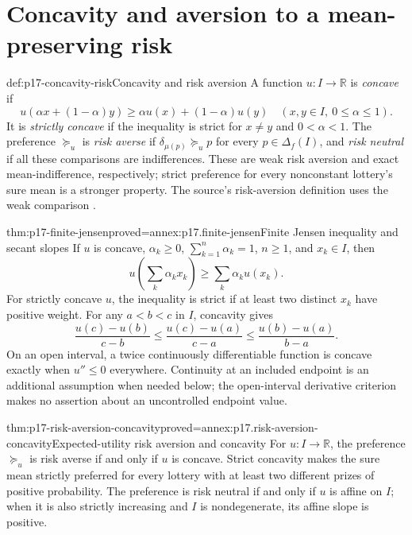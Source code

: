 \section{Concavity and aversion to a mean-preserving risk}
\label{sec:p17-risk-concavity}

\begin{hbdefinition}{def:p17-concavity-risk}{Concavity and risk aversion}
A function \(u:I\to\mathbb R\) is \emph{concave} if
\[
 u(\alpha x+(1-\alpha)y)
       \geq\alpha u(x)+(1-\alpha)u(y)
          \quad(x,y\in I,\ 0\leq\alpha\leq1).
\]
It is \emph{strictly concave} if the inequality is strict for
\(x\ne y\) and \(0<\alpha<1\).
The preference \(\succeq_u\) is \emph{risk averse} if
\(\delta_{\mu(p)}\succeq_u p\) for every \(p\in\Delta_f(I)\),
and \emph{risk neutral} if all these comparisons are indifferences.
These are weak risk aversion and exact mean-indifference, respectively;
strict preference for every nonconstant lottery's sure mean is a
stronger property. The source's risk-aversion definition uses the weak
comparison \cite[pp.~110--111]{Rubinstein2015LectureNotes}.
\end{hbdefinition}

\begin{hblemma}{thm:p17-finite-jensen}{proved=annex:p17.finite-jensen}{Finite Jensen inequality and secant slopes}
If \(u\) is concave, \(\alpha_k\geq0\), \(\sum_{k=1}^n\alpha_k=1\),
\(n\geq1\), and \(x_k\in I\), then
\[
             u\left(\sum_k\alpha_kx_k\right)
                        \geq\sum_k\alpha_ku(x_k).
\]
For strictly concave \(u\), the inequality is strict if at least two
distinct \(x_k\) have positive weight. For any \(a<b<c\) in \(I\),
concavity gives
\[
 \frac{u(c)-u(b)}{c-b}
 \leq\frac{u(c)-u(a)}{c-a}
 \leq\frac{u(b)-u(a)}{b-a}.
\]
On an open interval, a twice continuously differentiable function is
concave exactly when \(u''\leq0\) everywhere. Continuity at an
included endpoint is an additional assumption when needed below;
the open-interval derivative criterion makes no assertion about an
uncontrolled endpoint value.
\end{hblemma}

\begin{hbtheorem}{thm:p17-risk-aversion-concavity}{proved=annex:p17.risk-aversion-concavity}{Expected-utility risk aversion and concavity}
For \(u:I\to\mathbb R\), the preference \(\succeq_u\) is risk
averse if and only if \(u\) is concave. Strict concavity makes the
sure mean strictly preferred for every lottery with at least two
different prizes of positive probability.
The preference is risk neutral if and only if \(u\) is affine on
\(I\); when it is also strictly increasing and \(I\) is nondegenerate,
its affine slope is positive.
\end{hbtheorem}

